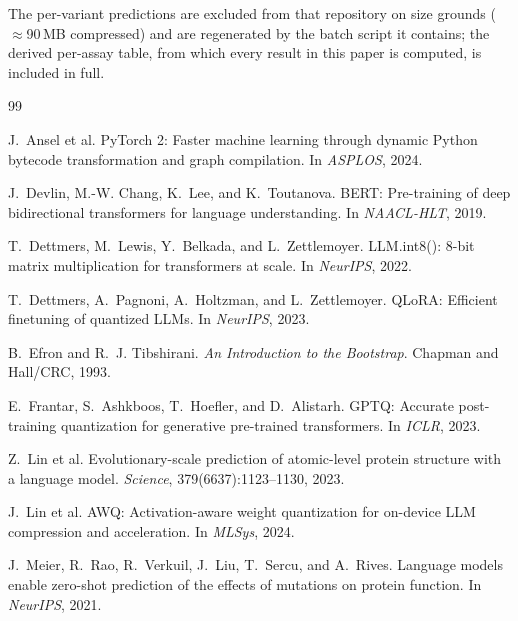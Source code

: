\documentclass[11pt]{article}
\begin{document}
The per-variant predictions are excluded from that repository on size grounds
($\approx$90\,MB compressed) and are regenerated by the batch script it
contains; the derived per-assay table, from which every result in this paper is
computed, is included in full.

\begin{thebibliography}{99}
\setlength{\itemsep}{1pt}

J.~Ansel et al.
\newblock PyTorch 2: Faster machine learning through dynamic Python bytecode
transformation and graph compilation.
\newblock In \emph{ASPLOS}, 2024.

J.~Devlin, M.-W. Chang, K.~Lee, and K.~Toutanova.
\newblock BERT: Pre-training of deep bidirectional transformers for language
understanding.
\newblock In \emph{NAACL-HLT}, 2019.

T.~Dettmers, M.~Lewis, Y.~Belkada, and L.~Zettlemoyer.
\newblock LLM.int8(): 8-bit matrix multiplication for transformers at scale.
\newblock In \emph{NeurIPS}, 2022.

T.~Dettmers, A.~Pagnoni, A.~Holtzman, and L.~Zettlemoyer.
\newblock QLoRA: Efficient finetuning of quantized LLMs.
\newblock In \emph{NeurIPS}, 2023.

B.~Efron and R.~J. Tibshirani.
\newblock \emph{An Introduction to the Bootstrap}.
\newblock Chapman and Hall/CRC, 1993.

E.~Frantar, S.~Ashkboos, T.~Hoefler, and D.~Alistarh.
\newblock GPTQ: Accurate post-training quantization for generative pre-trained
transformers.
\newblock In \emph{ICLR}, 2023.

Z.~Lin et al.
\newblock Evolutionary-scale prediction of atomic-level protein structure with a
language model.
\newblock \emph{Science}, 379(6637):1123--1130, 2023.

J.~Lin et al.
\newblock AWQ: Activation-aware weight quantization for on-device LLM
compression and acceleration.
\newblock In \emph{MLSys}, 2024.

J.~Meier, R.~Rao, R.~Verkuil, J.~Liu, T.~Sercu, and A.~Rives.
\newblock Language models enable zero-shot prediction of the effects of
mutations on protein function.
\newblock In \emph{NeurIPS}, 2021.


\end{thebibliography}
\end{document}
